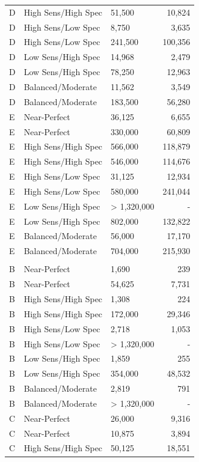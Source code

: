 \documentclass[
  letterpaper,
  DIV=11,
  numbers=noendperiod]{scrartcl}
\begin{document}
\begin{table}
{\begin{tabular*}{\linewidth}{@{\extracolsep{\fill}}lllr}
D & High Sens/High Spec & 51,500 & 10,824 \\ 
D & High Sens/Low Spec & 8,750 & 3,635 \\ 
D & High Sens/Low Spec & 241,500 & 100,356 \\ 
D & Low Sens/High Spec & 14,968 & 2,479 \\ 
D & Low Sens/High Spec & 78,250 & 12,963 \\ 
D & Balanced/Moderate & 11,562 & 3,549 \\ 
D & Balanced/Moderate & 183,500 & 56,280 \\ 
E & Near-Perfect & 36,125 & 6,655 \\ 
E & Near-Perfect & 330,000 & 60,809 \\ 
E & High Sens/High Spec & 566,000 & 118,879 \\ 
E & High Sens/High Spec & 546,000 & 114,676 \\ 
E & High Sens/Low Spec & 31,125 & 12,934 \\ 
E & High Sens/Low Spec & 580,000 & 241,044 \\ 
E & Low Sens/High Spec & > 1,320,000 & - \\ 
E & Low Sens/High Spec & 802,000 & 132,822 \\ 
E & Balanced/Moderate & 56,000 & 17,170 \\ 
E & Balanced/Moderate & 704,000 & 215,930 \\ 
\midrule\addlinespace[2.5pt]
\multicolumn{4}{l}{Conservative} \\[2.5pt] 
\midrule\addlinespace[2.5pt]
B & Near-Perfect & 1,690 & 239 \\ 
B & Near-Perfect & 54,625 & 7,731 \\ 
B & High Sens/High Spec & 1,308 & 224 \\ 
B & High Sens/High Spec & 172,000 & 29,346 \\ 
B & High Sens/Low Spec & 2,718 & 1,053 \\ 
B & High Sens/Low Spec & > 1,320,000 & - \\ 
B & Low Sens/High Spec & 1,859 & 255 \\ 
B & Low Sens/High Spec & 354,000 & 48,532 \\ 
B & Balanced/Moderate & 2,819 & 791 \\ 
B & Balanced/Moderate & > 1,320,000 & - \\ 
C & Near-Perfect & 26,000 & 9,316 \\ 
C & Near-Perfect & 10,875 & 3,894 \\ 
C & High Sens/High Spec & 50,125 & 18,551 \\ 

\end{tabular*}}
\end{table}
\end{document}

